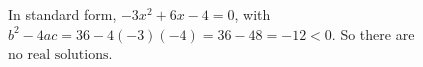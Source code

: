 In standard form, $-3x^2+6x-4=0$, with $b^2-4ac=36-4(-3)(-4)=36-48=-12<0$. So there are $\boxed{\text{no real solutions}}$.
